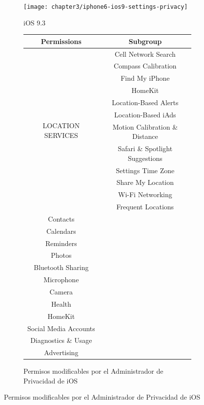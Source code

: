 \begin{figure}[!pb]
	\begin{subfigure}{.4\textwidth}
		\centering
		\texttt{[image: chapter3/iphone6-ios9-settings-privacy]}
    		\caption{iOS 9.3}
   		\label{fig:chapter03:iospermCapture}
	\end{subfigure}
	\begin{subfigure}{.55\textwidth}
	    \centering	
		\begin{tabular}{|c|c|}
			\hline
			Permissions		 					& Subgroup\\ \hline
			\multirow{12}{*}{LOCATION SERVICES} 	& Cell Network Search \\
								 				& Compass Calibration \\
												& Find My iPhone \\
												& HomeKit \\
												& Location-Based Alerts \\
												& Location-Based iAds \\
												& Motion Calibration \& Distance \\
												& Safari \& Spotlight Suggestions \\
												& Settings Time Zone\\
												& Share My Location \\
												& Wi-Fi Networking \\
												& Frequent Locations \\ \hline
			Contacts				& \\ \hline
			Calendars			& \\ \hline
			Reminders			& \\ \hline
			Photos				& \\ \hline
			Bluetooth Sharing 	& \\ \hline
			Microphone 			& \\ \hline
			Camera 				& \\ \hline
			Health 				& \\ \hline
			HomeKit 				& \\ \hline
			Social Media Accounts& \\ \hline
			Diagnostics \& Usage	& \\ \hline		
			Advertising			& \\ \hline
		\end{tabular}
		\caption{Permisos modificables por el Administrador de Privacidad de iOS}
		\label{tab:chapter03:iosperm}
	\end{subfigure}
\end{figure}
